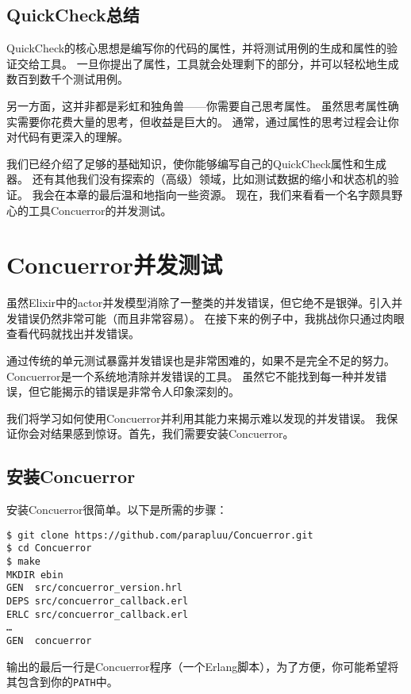 \subsection{QuickCheck总结}

QuickCheck的核心思想是编写你的代码的属性，并将测试用例的生成和属性的验证交给工具。
一旦你提出了属性，工具就会处理剩下的部分，并可以轻松地生成数百到数千个测试用例。

另一方面，这并非都是彩虹和独角兽------你需要自己思考属性。
虽然思考属性确实需要你花费大量的思考，但收益是巨大的。
通常，通过属性的思考过程会让你对代码有更深入的理解。

我们已经介绍了足够的基础知识，使你能够编写自己的QuickCheck属性和生成器。
还有其他我们没有探索的（高级）领域，比如测试数据的缩小和状态机的验证。
我会在本章的最后温和地指向一些资源。
现在，我们来看看一个名字颇具野心的工具Concuerror的并发测试。

\section{Concuerror并发测试}

虽然Elixir中的actor并发模型消除了一整类的并发错误，但它绝不是银弹。引入并发错误仍然非常可能（而且非常容易）。
在接下来的例子中，我挑战你只通过肉眼查看代码就找出并发错误。

通过传统的单元测试暴露并发错误也是非常困难的，如果不是完全不足的努力。
Concuerror是一个系统地清除并发错误的工具。
虽然它不能找到每一种并发错误，但它能揭示的错误是非常令人印象深刻的。

我们将学习如何使用Concuerror并利用其能力来揭示难以发现的并发错误。
我保证你会对结果感到惊讶。首先，我们需要安装Concuerror。

\subsection{安装Concuerror}

安装Concuerror很简单。以下是所需的步骤：

\begin{code}{}
\begin{verbatim}
$ git clone https://github.com/parapluu/Concuerror.git
$ cd Concuerror
$ make
MKDIR ebin
GEN  src/concuerror_version.hrl
DEPS src/concuerror_callback.erl
ERLC src/concuerror_callback.erl
…
GEN  concuerror
\end{verbatim}
\end{code}

输出的最后一行是Concuerror程序（一个Erlang脚本），为了方便，你可能希望将其包含到你的\texttt{PATH}中。

